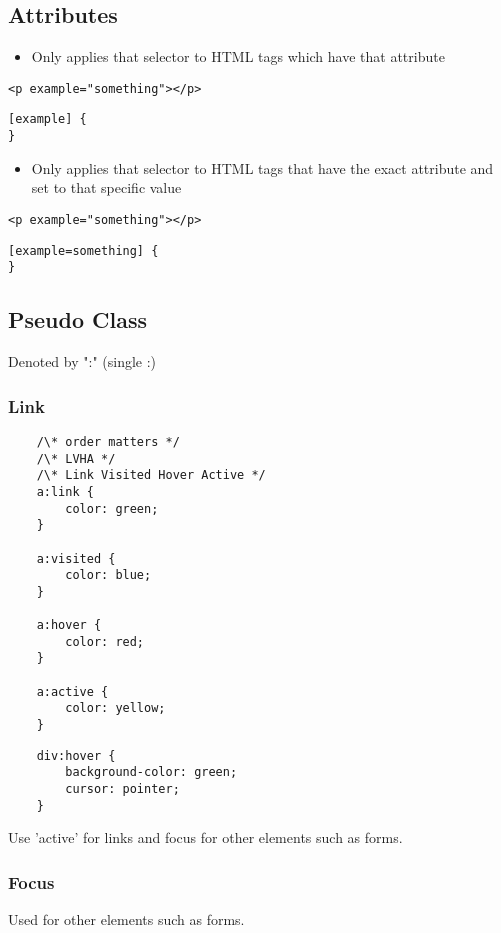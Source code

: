 \documentclass[]{article}
\newcommand{\<}{\guilsinglleft}
\renewcommand{\>}{\guilsinglright}
\begin{document}
\subsection{Attributes}
\begin{itemize}
	\item Only applies that selector to HTML tags which have that attribute
\end{itemize}
\begin{lstlisting}
<p example="something"></p>
\end{lstlisting}
\begin{lstlisting}
[example] {
}
\end{lstlisting}
\begin{itemize}
	\item Only applies that selector to HTML tags that have the exact attribute and set to that specific value 
\end{itemize}
\begin{lstlisting}
<p example="something"></p>
\end{lstlisting}
\begin{lstlisting}
[example=something] {
}
\end{lstlisting}

\subsection{Pseudo Class}
Denoted by ":" (single :) 
\subsubsection{Link}
\begin{lstlisting}
	/\* order matters */
	/\* LVHA */
	/\* Link Visited Hover Active */
	a:link {
		color: green;
	}
	
	a:visited {
		color: blue;
	}
	
	a:hover {
		color: red;
	}
	
	a:active {
		color: yellow;
	}
\end{lstlisting}

\begin{lstlisting}
	div:hover {
		background-color: green;
		cursor: pointer;
	}
\end{lstlisting}
Use 'active' for links and focus for other elements such as forms.

\subsubsection{Focus}
Used for other elements such as forms.
\end{document}
